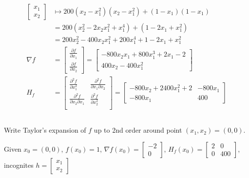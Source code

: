 \documentclass[unicode,11pt,a4paper,oneside,numbers=endperiod,openany]{scrartcl}
\begin{document}
\begin{equation*}
\begin{aligned}
    \begin{bmatrix} x_1 \\ x_2 \end{bmatrix}
     & \mapsto 200 (x_2 - x_1^2) (x_2 - x_1^2) + (1 - x_1) (1 - x_1) \\
     & = 200 (x_2^2 - 2x_2 x_1^2 + x_1^4) + (1 - 2x_1 + x_1^2)       \\
     & = 200 x_2^2 - 400 x_2 x_1^2 + 200 x_1^4 + 1 - 2x_1 + x_1^2    \\
    \nabla f
     & = \begin{bmatrix}
             \frac{\partial f}{\partial x_1} \\
             \frac{\partial f}{\partial x_2}
         \end{bmatrix}
    = \begin{bmatrix}
          -800 x_2 x_1 + 800 x_1^3 + 2x_1 - 2 \\
          400 x_2 - 400 x_1^2
      \end{bmatrix} \\
    H_f
     & =\begin{bmatrix}
            \frac{\partial^2 f}{\partial x_1^2}            
            & \frac{\partial^2 f}{\partial x_1 \partial x_2} \\
            \frac{\partial^2 f}{\partial x_2 \partial x_1} 
            & \frac{\partial^2 f}{\partial x_2^2}            \\
        \end{bmatrix}
    = \begin{bmatrix}
          -800 x_2 + 2400 x_1^2 + 2 & - 800 x_1 \\
          -800 x_1                  & 400
      \end{bmatrix}
\end{aligned}
\end{equation*}

\subsection{}
Write Taylor's expansion of $f$ up to 2nd order around point
$(x_1, x_2) = (0, 0)$. \newline

Given $x_0 = (0, 0)$, $f(x_0) = 1$, 
$\nabla f(x_0) = \begin{bmatrix} -2 \\ 0 \end{bmatrix}$, 
$H_f(x_0) = \begin{bmatrix} 2 & 0 \\ 0 & 400 \end{bmatrix}$, 
incognites $h = \begin{bmatrix} x_1 \\ x_2 \end{bmatrix}$
\end{document}
